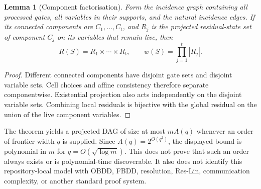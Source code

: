 \documentclass[11pt]{article}
\newtheorem{lemma}{Lemma}
\begin{document}
\begin{lemma}[Component factorisation]
Form the incidence graph containing all processed gates, all variables in their supports, and the natural incidence edges. If its connected components are $C_1,\ldots,C_t$, and $R_j$ is the projected residual-state set of component $C_j$ on its variables that remain live, then
\[
 R(S)=R_1\times\cdots\times R_t,
 \qquad
 w(S)=\prod_{j=1}^{t}|R_j|.
\]
\end{lemma}

\begin{proof}
Different connected components have disjoint gate sets and disjoint variable sets. Cell choices and affine consistency therefore separate componentwise. Existential projection also acts independently on the disjoint variable sets. Combining local residuals is bijective with the global residual on the union of the live component variables.
\end{proof}

The theorem yields a projected DAG of size at most $mA(q)$ whenever an order of frontier width $q$ is supplied. Since $A(q)=2^{O(q^2)}$, the displayed bound is polynomial in $m$ for $q=O(\sqrt{\log m})$. This does not prove that such an order always exists or is polynomial-time discoverable. It also does not identify this repository-local model with OBDD, FBDD, resolution, Res-Lin, communication complexity, or another standard proof system.
\end{document}
